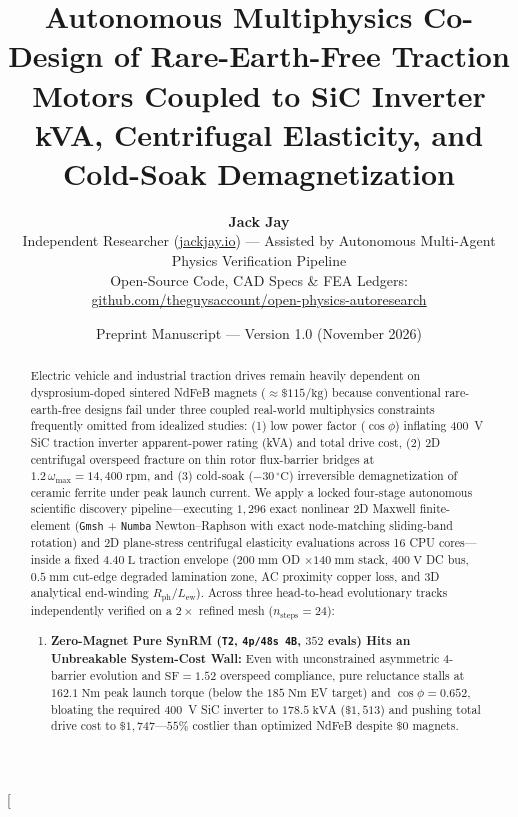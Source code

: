 \documentclass[twocolumn,10pt]{article}
\title{\vspace{-1.4em}\Large\bfseries Autonomous Multiphysics Co-Design of Rare-Earth-Free Traction Motors Coupled to SiC Inverter kVA, Centrifugal Elasticity, and Cold-Soak Demagnetization}
\author{
  \normalsize\textbf{Jack Jay}\\[2pt]
  \small\color{slate} Independent Researcher (\href{https://jackjay.io}{jackjay.io}) --- Assisted by Autonomous Multi-Agent Physics Verification Pipeline\\[-2pt]
  \small\color{slate} Open-Source Code, CAD Specs \& FEA Ledgers: \href{https://github.com/theguysaccount/open-physics-autoresearch}{github.com/theguysaccount/open-physics-autoresearch}
}
\date{\small Preprint Manuscript --- Version 1.0 (November 2026)}
\begin{document}
\twocolumn[
  \begin{@twocolumnfalse}
    \maketitle
    \vspace{-1.0em}
    \begin{abstract}
      \noindent Electric vehicle and industrial traction drives remain heavily dependent on dysprosium-doped sintered NdFeB magnets ($\approx\$115/\text{kg}$) because conventional rare-earth-free designs fail under three coupled real-world multiphysics constraints frequently omitted from idealized studies: (1) low power factor ($\cos\phi$) inflating 400~V SiC traction inverter apparent-power rating (kVA) and total drive cost, (2) 2D centrifugal overspeed fracture on thin rotor flux-barrier bridges at $1.2\,\omega_{\max}=14{,}400\;\text{rpm}$, and (3) cold-soak ($-30\,^\circ\text{C}$) irreversible demagnetization of ceramic ferrite under peak launch current. We apply a locked four-stage autonomous scientific discovery pipeline---executing $1{,}296$ exact nonlinear 2D Maxwell finite-element (\texttt{Gmsh} + \texttt{Numba} Newton--Raphson with exact node-matching sliding-band rotation) and 2D plane-stress centrifugal elasticity evaluations across 16 CPU cores---inside a fixed $4.40\;\text{L}$ traction envelope ($200\;\text{mm}$ OD $\times 140\;\text{mm}$ stack, $400\;\text{V}$ DC bus, $0.5\;\text{mm}$ cut-edge degraded lamination zone, AC proximity copper loss, and 3D analytical end-winding $R_{\text{ph}}/L_{\text{ew}}$). Across three head-to-head evolutionary tracks independently verified on a $2\times$ refined mesh ($n_{\text{steps}}=24$):
      \begin{enumerate}\setlength{\itemsep}{1pt}\setlength{\topsep}{2pt}
        \item \textbf{Zero-Magnet Pure SynRM (\texttt{T2}, \texttt{4p/48s 4B}, $352$ evals) Hits an Unbreakable System-Cost Wall:} Even with unconstrained asymmetric 4-barrier evolution and $\text{SF}=1.52$ overspeed compliance, pure reluctance stalls at $162.1\;\text{Nm}$ peak launch torque (below the $185\;\text{Nm}$ EV target) and $\cos\phi=0.652$, bloating the required 400~V SiC inverter to $178.5\;\text{kVA}$ ($\$1{,}513$) and pushing total drive cost to $\$1{,}747$---$55\%$ costlier than optimized NdFeB despite $\$0$ magnets.

\end{enumerate}
\end{abstract}
\end{@twocolumnfalse}
\end{document}
